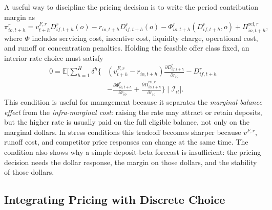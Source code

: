 \documentclass[11pt]{article}
\begin{document}
A useful way to discipline the pricing decision is to write the period
contribution margin as
\[
  \pi_{io,t+h}^{r}
  =
  v_{t+h}^{F,r}D_{if,t+h}^{r}(o)
  -r_{io,t+h}D_{if,t+h}^{r}(o)
  -\Phi_{io,t+h}^{r}(D_{if,t+h}^{r},o)
  +\Pi_{io,t+h}^{\mathrm{rel},r},
\]
where $\Phi$ includes servicing cost, incentive cost, liquidity charge,
operational cost, and runoff or concentration penalties. Holding the feasible
offer class fixed, an interior rate choice must satisfy
\[
\begin{aligned}
  0
  =
  \mathbb{E}\!\Bigg[
  \sum_{h=1}^{H}\delta^h
  \Big\{
    &(v_{t+h}^{F,r}-r_{io,t+h})
    \frac{\partial D_{if,t+h}^{r}}{\partial r_{io}}
    -D_{if,t+h}^{r} \\
    &-\frac{\partial \Phi_{io,t+h}^{r}}{\partial r_{io}}
    +\frac{\partial \Pi_{io,t+h}^{\mathrm{rel},r}}{\partial r_{io}}
  \Big\}
  \mid\mathcal{I}_{it}\Bigg].
\end{aligned}
\]
This condition is useful for management because it separates the \emph{marginal
balance effect} from the \emph{infra-marginal cost}: raising the rate may
attract or retain deposits, but the higher rate is usually paid on the full
eligible balance, not only on the marginal dollars. In stress conditions this
tradeoff becomes sharper because $v^{F,r}$, runoff cost, and competitor price
responses can change at the same time. The condition also shows why a simple
deposit-beta forecast is insufficient: the pricing decision needs the dollar
response, the margin on those dollars, and the stability of those dollars.

\subsection{Integrating Pricing with Discrete Choice}
\end{document}
